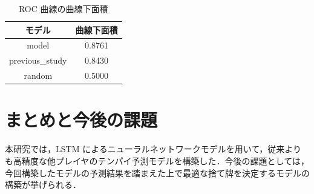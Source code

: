 \documentclass[a4paper,twoside,twocolumn,10pt]{article}
\begin{document}
\begin{table}[tb]
  \caption{ROC 曲線の曲線下面積}
  \label{auc_tenpai}
  \centering
  \begin{tabular}{|c||c|} \hline
  モデル & 曲線下面積 \\ \hline \hline
  model & 0.8761\\ \hline
  previous\_study & 0.8430\\ \hline
  random & 0.5000\\ \hline
  \end{tabular}
\end{table}
\section{まとめと今後の課題}
本研究では，LSTM によるニューラルネットワークモデルを用いて，従来よりも高精度な他プレイヤのテンパイ予測モデルを構築した．今後の課題としては，今回構築したモデルの予測結果を踏まえた上で最適な捨て牌を決定するモデルの構築が挙げられる．




\end{document}
